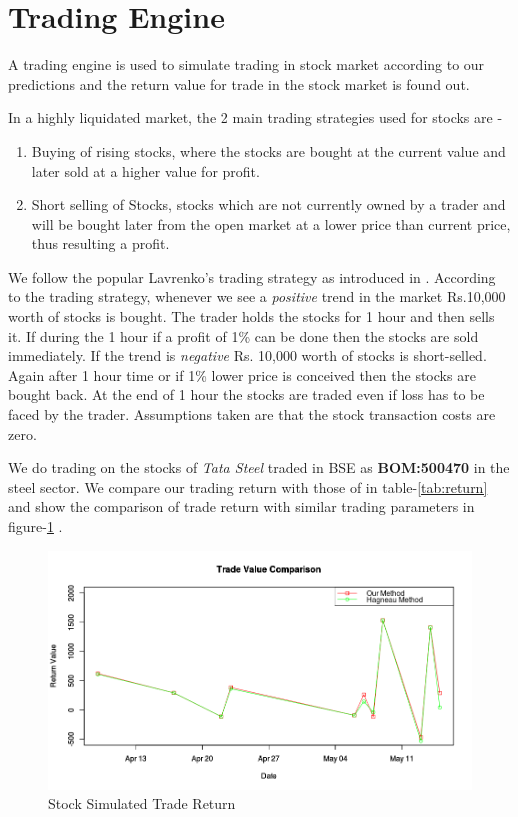 \documentclass[a4paper,12bp]{report}
\begin{document}
\section{Trading Engine}
A trading engine is used to simulate trading in stock market according to our predictions and the return value for trade in the stock market is found out. 

In a highly liquidated market, the 2 main trading strategies used for stocks are - 
\begin{enumerate}
\item Buying of rising stocks, where the stocks are bought at the current value and later sold at a higher value for profit.
\item Short selling of Stocks, stocks which are not currently owned by a trader and will be bought later from the open market at a lower price than current price, thus resulting a profit.
\end{enumerate}

We follow the popular Lavrenko's trading strategy as introduced in \cite{lavrenko2000language}. According to the trading strategy, whenever we see a \textit{positive} trend in the market Rs.10,000 worth of stocks is bought. The trader holds the stocks for 1 hour and then sells it. If during the 1 hour if a profit of 1\% can be done then the stocks are sold immediately. If the trend is \textit{negative} Rs. 10,000 worth of stocks is short-selled. Again after 1 hour time or if 1\% lower price is conceived then the stocks are bought back. At the end of 1 hour the stocks are traded even if loss has to be faced by the trader. Assumptions taken are that the stock transaction costs are zero. 


We do trading on the stocks of \textit{Tata Steel} traded in BSE as \textbf{BOM:500470} in the steel sector. We compare our trading return with those of \cite{Hagenau:2013} in table-\ref{tab:return} and show the comparison of  trade return with similar trading parameters in figure-\ref{fig:trade} . 

\begin{figure}[htbp]
\centering
\includegraphics[scale = 0.5]{pictures/tradeReturn.png}
\caption{Stock Simulated Trade Return}
\label{fig:trade}
\end{figure}
\end{document}
